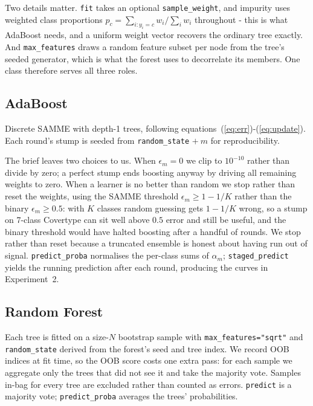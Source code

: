 \documentclass[conference]{IEEEtran}
\begin{document}
Two details matter.  \texttt{fit} takes an optional
\texttt{sample\_weight}, and impurity uses weighted class proportions
$p_c = \sum_{i: y_i=c} w_i / \sum_i w_i$ throughout - this is what
AdaBoost needs, and a uniform weight vector recovers the ordinary tree
exactly.  And \texttt{max\_features} draws a random feature subset per node
from the tree's seeded generator, which is what the forest uses to
decorrelate its members.  One class therefore serves all three roles.

\subsection{AdaBoost}
Discrete SAMME with depth-1 trees, following
equations~(\ref{eq:err})-(\ref{eq:update}).  Each round's stump is seeded
from \texttt{random\_state} $+\ m$ for reproducibility.

The brief leaves two choices to us.  When $\epsilon_m = 0$ we clip to
$10^{-10}$ rather than divide by zero; a perfect stump ends boosting anyway
by driving all remaining weights to zero.  When a learner is no better than
random we stop rather than reset the weights, using the SAMME threshold
$\epsilon_m \geq 1 - 1/K$ rather than the binary $\epsilon_m \geq 0.5$:
with $K$ classes random guessing gets $1-1/K$ wrong, so a stump on 7-class
Covertype can sit well above $0.5$ error and still be useful, and the
binary threshold would have halted boosting after a handful of rounds.  We
stop rather than reset because a truncated ensemble is honest about having
run out of signal.  \texttt{predict\_proba} normalises the per-class sums
of $\alpha_m$; \texttt{staged\_predict} yields the running prediction after
each round, producing the curves in Experiment~2.

\subsection{Random Forest}
Each tree is fitted on a size-$N$ bootstrap sample with
\texttt{max\_features="sqrt"} and \texttt{random\_state} derived from the
forest's seed and tree index.  We record OOB indices at fit time, so the
OOB score costs one extra pass: for each sample we aggregate only the trees
that did not see it and take the majority vote.  Samples in-bag for every
tree are excluded rather than counted as errors.  \texttt{predict} is a
majority vote; \texttt{predict\_proba} averages the trees' probabilities.
\end{document}
